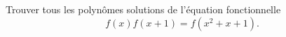 Trouver tous les polynômes solutions de l'équation fonctionnelle
\[ f(x)f(x + 1) = f(x^2 + x + 1). \]
